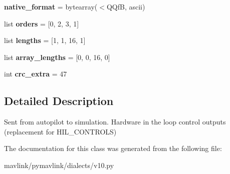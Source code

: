 \begin{DoxyCompactItemize}
\mbox{\label{classpymavlink_1_1dialects_1_1v10_1_1MAVLink__hil__actuator__controls__message_ad9c89be2af061af368181537ff939df3}} 
{\bfseries native\+\_\+format} = bytearray(\textquotesingle{}$<$Q\+QfB\textquotesingle{}, \textquotesingle{}ascii\textquotesingle{})
\item 
\mbox{\label{classpymavlink_1_1dialects_1_1v10_1_1MAVLink__hil__actuator__controls__message_a597339bf00dff8966429fd9281621d13}} 
list {\bfseries orders} = \mbox{[}0, 2, 3, 1\mbox{]}
\item 
\mbox{\label{classpymavlink_1_1dialects_1_1v10_1_1MAVLink__hil__actuator__controls__message_a33c2ba42151dc8e6599da8aa0c5a650e}} 
list {\bfseries lengths} = \mbox{[}1, 1, 16, 1\mbox{]}
\item 
\mbox{\label{classpymavlink_1_1dialects_1_1v10_1_1MAVLink__hil__actuator__controls__message_a7d1871f01cf17d8163c1027a1f792c46}} 
list {\bfseries array\+\_\+lengths} = \mbox{[}0, 0, 16, 0\mbox{]}
\item 
\mbox{\label{classpymavlink_1_1dialects_1_1v10_1_1MAVLink__hil__actuator__controls__message_a878fc836cdd94b55b50de259c73340f7}} 
int {\bfseries crc\+\_\+extra} = 47
\end{DoxyCompactItemize}


\subsection{Detailed Description}
\begin{DoxyVerb}Sent from autopilot to simulation. Hardware in the loop
control outputs (replacement for HIL_CONTROLS)
\end{DoxyVerb}
 

The documentation for this class was generated from the following file\+:\begin{DoxyCompactItemize}
\item 
mavlink/pymavlink/dialects/v10.\+py\end{DoxyCompactItemize}
